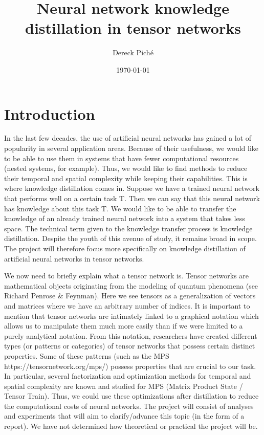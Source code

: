 \documentclass[11pt]{article}
\title{Neural network knowledge distillation in tensor networks}
\author{Dereck Piché}
\date{\today}
\begin{document}
\maketitle
\begin{abstract}
\end{abstract}

\section{Introduction}
In the last few decades, the use of artificial neural networks has gained a lot of popularity in several application areas. Because of their usefulness, we would like to be able to use them in systems that have fewer computational resources (nested systems, for example). Thus, we would like to find methods to reduce their temporal and spatial complexity while keeping their capabilities. This is where knowledge distillation comes in. Suppose we have a trained neural network that performs well on a certain task T. Then we can say that this neural network has knowledge about this task T. We would like to be able to transfer the knowledge of an already trained neural network into a system that takes less space. The technical term given to the knowledge transfer process is knowledge distillation. Despite the youth of this avenue of study, it remains broad in scope. The project will therefore focus more specifically on knowledge distillation of artificial neural networks in tensor networks. 

We now need to briefly explain what a tensor network is. Tensor networks are mathematical objects originating from the modeling of quantum phenomena (see Richard Penrose & Feynman). Here we see tensors as a generalization of vectors and matrices where we have an arbitrary number of indices. It is important to mention that tensor networks are intimately linked to a graphical notation which allows us to manipulate them much more easily than if we were limited to a purely analytical notation. From this notation, researchers have created different types (or patterns or categories) of tensor networks that possess certain distinct properties. Some of these patterns (such as the MPS https://tensornetwork.org/mps/) possess properties that are crucial to our task. In particular, several factorization and optimization methods for temporal and spatial complexity are known and studied for MPS (Matrix Product State / Tensor Train). Thus, we could use these optimizations after distillation to reduce the computational costs of neural networks. The project will consist of analyses and experiments that will aim to clarify/advance this topic (in the form of a report). We have not determined how theoretical or practical the project will be.
\end{document}
